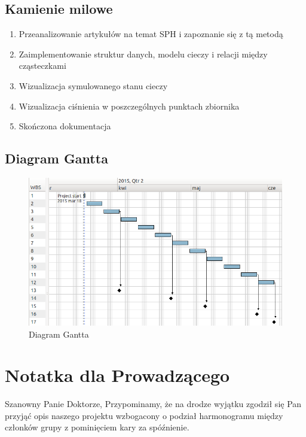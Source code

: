\documentclass[a4paper]{article}
\begin{document}
\subsection{Kamienie milowe}
\begin{enumerate}[label=K\arabic*{.}]
    \item Przeanalizowanie artykułów na temat SPH i zapoznanie się z tą metodą
    \item Zaimplementowanie struktur danych, modelu cieczy i relacji między cząsteczkami
    \item Wizualizacja symulowanego stanu cieczy
    \item Wizualizacja ciśnienia w poszczególnych punktach zbiornika
    \item Skończona dokumentacja
\end{enumerate}

\subsection{Diagram Gantta}
\begin{figure}[h] %
    \begin{center}
        \includegraphics[width=\textwidth]{./rysunki/gantt.png}
    \end{center}
    \caption{Diagram Gantta}
    \label{fig:gantt}
\end{figure}

\section{Notatka dla Prowadzącego}
Szanowny Panie Doktorze,
Przypominamy, że na drodze wyjątku zgodził się Pan przyjąć opis naszego projektu wzbogacony o podział harmonogramu między członków grupy z pominięciem kary za spóźnienie.
\end{document}
